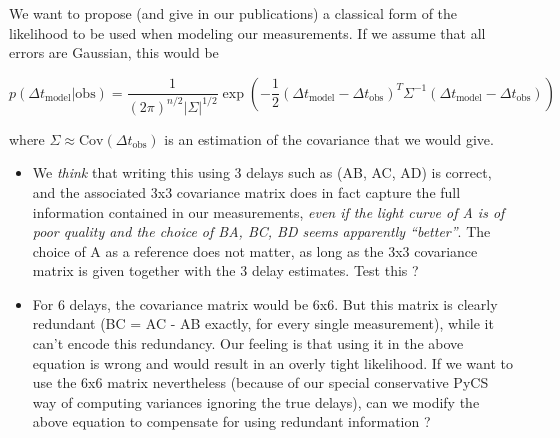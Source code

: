 \documentclass[11pt]{scrartcl}
\newcommand{\dt}[1]{\ensuremath{\Delta t_{\mathrm{#1}}}\xspace}
\begin{document}
We want to propose (and give in our publications) a classical form of the likelihood to be used when modeling our measurements. If we assume that all errors are Gaussian, this would be

\begin{equation}
p(\dt{model} | \mathrm{obs}) = \frac{1}{(2 \pi)^{n/2} |\Sigma|^{1/2}}\exp\left( -\frac{1}{2} (\dt{model}-\dt{obs})^T\Sigma^{-1}(\dt{model}-\dt{obs}) \right)
\end{equation}

where $\Sigma \approx \textrm{Cov}(\dt{obs})$ is an estimation of the covariance that we would give.

\begin{itemize}
\item We \emph{think} that writing this using 3 delays such as (AB, AC, AD) is correct, and the associated 3x3 covariance matrix does in fact capture the full information contained in our measurements, \emph{even if the light curve of A is of poor quality and the choice of BA, BC, BD seems apparently ``better''}. The choice of A as a reference does not matter, as long as the 3x3 covariance matrix is given together with the 3 delay estimates. Test this ?
\item For 6 delays, the covariance matrix would be 6x6. But this matrix is clearly redundant (BC = AC - AB exactly, for every single measurement), while it can't encode this redundancy. Our feeling is that using it in the above equation is wrong and would result in an overly tight likelihood. If we want to use the 6x6 matrix nevertheless (because of our special conservative PyCS way of computing variances ignoring the true delays), can we modify the above equation to compensate for using redundant information ?

\end{itemize}
\end{document}
